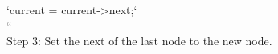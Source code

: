 \documentclass[preview]{standalone}
\begin{document}
`current = current->next;`\\``\\Step 3: Set the next of the last node to the new node.\\
\end{document}
